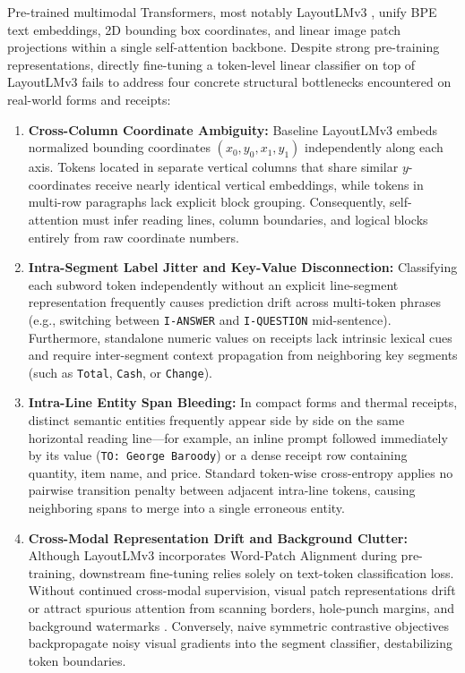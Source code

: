 Pre-trained multimodal Transformers, most notably LayoutLMv3 \cite{huang2022layoutlmv3}, unify BPE text embeddings, 2D bounding box coordinates, and linear image patch projections within a single self-attention backbone. Despite strong pre-training representations, directly fine-tuning a token-level linear classifier on top of LayoutLMv3 fails to address four concrete structural bottlenecks encountered on real-world forms and receipts:
\begin{enumerate}
    \item \textbf{Cross-Column Coordinate Ambiguity:}
    Baseline LayoutLMv3 embeds normalized bounding coordinates $(x_0, y_0, x_1, y_1)$ independently along each axis. Tokens located in separate vertical columns that share similar $y$-coordinates receive nearly identical vertical embeddings, while tokens in multi-row paragraphs lack explicit block grouping. Consequently, self-attention must infer reading lines, column boundaries, and logical blocks entirely from raw coordinate numbers.

    \item \textbf{Intra-Segment Label Jitter and Key-Value Disconnection:}
    Classifying each subword token independently without an explicit line-segment representation frequently causes prediction drift across multi-token phrases (e.g., switching between \texttt{I-ANSWER} and \texttt{I-QUESTION} mid-sentence). Furthermore, standalone numeric values on receipts lack intrinsic lexical cues and require inter-segment context propagation from neighboring key segments (such as \texttt{Total}, \texttt{Cash}, or \texttt{Change}).

    \item \textbf{Intra-Line Entity Span Bleeding:}
    In compact forms and thermal receipts, distinct semantic entities frequently appear side by side on the same horizontal reading line—for example, an inline prompt followed immediately by its value (\texttt{TO: George Baroody}) or a dense receipt row containing quantity, item name, and price. Standard token-wise cross-entropy applies no pairwise transition penalty between adjacent intra-line tokens, causing neighboring spans to merge into a single erroneous entity.

    \item \textbf{Cross-Modal Representation Drift and Background Clutter:}
    Although LayoutLMv3 incorporates Word-Patch Alignment during pre-training, downstream fine-tuning relies solely on text-token classification loss. Without continued cross-modal supervision, visual patch representations drift or attract spurious attention from scanning borders, hole-punch margins, and background watermarks \cite{wang2023aetnet,xie2026roap}. Conversely, naive symmetric contrastive objectives backpropagate noisy visual gradients into the segment classifier, destabilizing token boundaries.
\end{enumerate}

